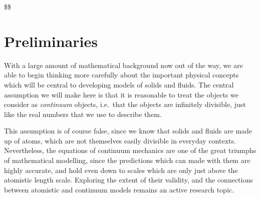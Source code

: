 \documentclass[
  letterpaper,
  DIV=11,
  numbers=noendperiod]{scrreprt}
\theoremstyle{plain}
\theoremstyle{remark}
\begin{document}
\newcommand{\bftau}{{\boldsymbol{\tau}}}
\newcommand{\bfnu}{{\boldsymbol{\nu}}}
\newcommand{\bfpsi}{{\boldsymbol{\psi}}}
\newcommand{\bfphi}{{\boldsymbol{\varphi}}}
\newcommand{\bfSigma}{{\boldsymbol{\Sigma}}}
\newcommand{\calI}{{\mathcal{I}}}
\newcommand{\calN}{{\mathcal{N}}}
\newcommand{\calV}{{\mathcal{V}}}
\newcommand{\bbE}{{\mathbb{E}}}
\newcommand{\bbR}{{\mathbb{R}}}
\newcommand{\bbC}{{\mathbb{C}}}
\newcommand{\bsfC}{{\mathsf{C}}}
\newcommand{\bsfD}{{\mathsf{D}}}
\newcommand{\bsfI}{{\mathsf{I}}}
\newcommand{\bsfO}{{\mathsf{O}}}
\newcommand{\tr}{{\operatorname{tr}}}
\newcommand{\sym}{{\operatorname{sym}}}
\newcommand{\skw}{{\operatorname{skew}}}
\newcommand{\vc}{{\operatorname{vec}}}
\newcommand{\ten}{{\operatorname{ten}}}
\newcommand{\cof}{{\operatorname{cof}}}
\newcommand{\mass}{{\operatorname{mass}}}
\newcommand{\vol}{{\operatorname{vol}}}
\newcommand{\area}{{\operatorname{area}}}
\newcommand{\com}{{\operatorname{com}}}
\newcommand{\cov}{{\operatorname{cov}}}
\newcommand{\e}{{\mathrm{e}}}
\newcommand{\D}{{\mathrm{D}}}
\newcommand{\d}{{\mathrm{d}}}
\newcommand{\dt}{{\d t}}
\newcommand{\Dt}{{\D t}}
\newcommand{\bigO}{{O}}
\newcommand{\litO}{{o}}
\newcommand{\dVx}{{\,\d V_{\bfx}}}
\newcommand{\dAx}{{\,\d A_{\bfx}}}
\newcommand{\dVy}{{\,\d V_{\bfy}}}
\newcommand{\dAy}{{\,\d A_{\bfy}}}
\newcommand{\ds}{{\,\d s}}

\$\$

\section{Preliminaries}\label{preliminaries-2}

With a large amount of mathematical background now out of the way, we
are able to begin thinking more carefully about the important physical
concepts which will be central to developing models of solids and
fluids. The central assumption we will make here is that it is
reasonable to treat the objects we consider as \emph{continuum} objects,
i.e.~that the objects are infinitely divisible, just like the real
numbers that we use to describe them.

This assumption is of course false, since we know that solids and fluids
are made up of atoms, which are not themselves easily divisible in
everyday contexts. Nevertheless, the equations of continuum mechanics
are one of the great triumphs of mathematical modelling, since the
predictions which can made with them are highly accurate, and hold even
down to scales which are only just above the atomistic length scale.
Exploring the extent of their validity, and the connections between
atomistic and continuum models remains an active research topic.
\end{document}
